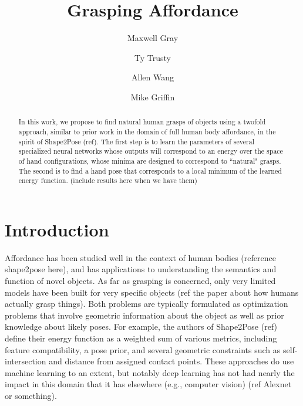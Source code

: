 \documentclass[10pt,twocolumn,letterpaper]{article}
\begin{document}
\title{Grasping Affordance}

\author{Maxwell Gray\\
\and
Ty Trusty\\
\and
Allen Wang\\
\and
Mike Griffin
}
\maketitle

\begin{abstract}
   In this work, we propose to find natural human grasps of objects using a twofold approach, similar to prior work in the domain of full human body affordance, in the spirit of Shape2Pose (ref). The first step is to learn the parameters of several specialized neural networks whose outputs will correspond to an energy over the space of hand configurations, whose minima are designed to correspond to ``natural" grasps. The second is to find a hand pose that corresponds to a local minimum of the learned energy function. (include results here when we have them)
\end{abstract}

\section{Introduction}
Affordance has been studied well in the context of human bodies (reference shape2pose here), and has applications to understanding the semantics and function of novel objects. As far as grasping is concerned, only very limited models have been built for very specific objects (ref the paper about how humans actually grasp things). Both problems are typically formulated as optimization problems that involve geometric information about the object as well as prior knowledge about likely poses. For example, the authors of Shape2Pose (ref) define their energy function as a weighted sum of various metrics, including feature compatibility, a pose prior, and several geometric constraints such as self-intersection and distance from assigned contact points. These approaches do use machine learning to an extent, but notably deep learning has not had nearly the impact in this domain that it has elsewhere (e.g., computer vision) (ref Alexnet or something).
\end{document}

